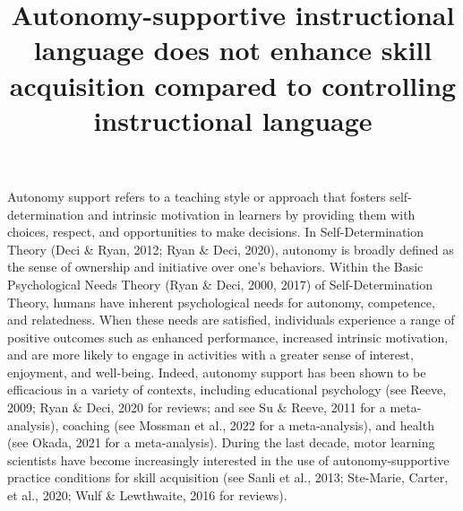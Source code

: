 \documentclass[
  doc, donotrepeattitle,floatsintext]{apa7}
\title{Autonomy-supportive instructional language does not enhance skill acquisition compared to controlling instructional language}
\author{\phantom{0}}
\date{}
\affiliation{\phantom{0}}
\begin{document}
\maketitle

Autonomy support refers to a teaching style or approach that fosters self-determination and intrinsic motivation in learners by providing them with choices, respect, and opportunities to make decisions. In Self-Determination Theory (Deci \& Ryan, 2012; Ryan \& Deci, 2020), autonomy is broadly defined as the sense of ownership and initiative over one's behaviors. Within the Basic Psychological Needs Theory (Ryan \& Deci, 2000, 2017) of Self-Determination Theory, humans have inherent psychological needs for autonomy, competence, and relatedness. When these needs are satisfied, individuals experience a range of positive outcomes such as enhanced performance, increased intrinsic motivation, and are more likely to engage in activities with a greater sense of interest, enjoyment, and well-being. Indeed, autonomy support has been shown to be efficacious in a variety of contexts, including educational psychology (see Reeve, 2009; Ryan \& Deci, 2020 for reviews; and see Su \& Reeve, 2011 for a meta-analysis), coaching (see Mossman et al., 2022 for a meta-analysis), and health (see Okada, 2021 for a meta-analysis). During the last decade, motor learning scientists have become increasingly interested in the use of autonomy-supportive practice conditions for skill acquisition (see Sanli et al., 2013; Ste-Marie, Carter, et al., 2020; Wulf \& Lewthwaite, 2016 for reviews).
\end{document}

